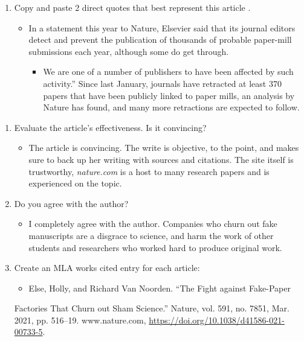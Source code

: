\documentclass{scrartcl}
\begin{document}
\begin{enumerate}
\item Copy and paste 2 direct quotes that best represent this article .
\begin{itemize}
\item In a statement this year to Nature, Elsevier said that its journal editors detect and prevent the publication of thousands of probable paper-mill submissions each year, although some do get through.

\begin{itemize}
\item We are one of a number of publishers to have been affected by such activity.” Since last January, journals have retracted at least 370 papers that have been publicly linked to paper mills, an analysis by Nature has found, and many more retractions are expected to follow.
\end{itemize}
\end{itemize}
\end{enumerate}


\begin{enumerate}
\item Evaluate the article's effectiveness. Is it convincing?
\begin{itemize}
\item The article is convincing. The write is objective, to the point, and makes
sure to back up her writing with sources and citations. The site itself is
trustworthy, \emph{nature.com} is a host to many research papers and is
experienced on the topic.
\end{itemize}

\item Do you agree with the author?
\begin{itemize}
\item I completely agree with the author.  Companies who churn out fake
manuscripts are a disgrace to science, and harm the work of other students
and researchers who worked hard to produce original work.
\end{itemize}

\item Create an MLA works cited entry for each article:
\begin{itemize}
\item Else, Holly, and Richard Van Noorden. “The Fight against Fake-Paper
\end{itemize}
Factories That Churn out Sham Science.” Nature, vol. 591, no. 7851, Mar.
2021, pp. 516–19. www.nature.com, \url{https://doi.org/10.1038/d41586-021-00733-5}.
\end{enumerate}
\end{document}
